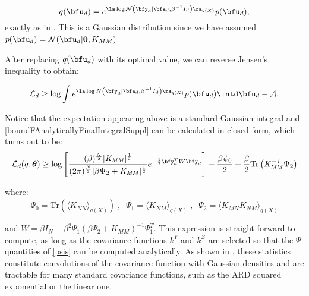 \begin{equation}
\label{qu}
q(\bfu_d) = e^{\la \log \mathcal{N} \left( \bfy_d | \bfa_d, \beta^{-1} I_d \right) \ra_{q(X)}}
		p(\bfu_d) ,
\end{equation}
exactly as in \cite{Titsias:bayesGPLVM10}. This is a Gaussian distribution since we have assumed
$p(\bfu_d ) = \mathcal{N} (\bfu_d | \mathbf{0}, K_{MM} )$.

\par After replacing $q(\bfu_d)$ with its optimal value, we can reverse Jensen's inequality to obtain:

\begin{equation}
\label{boundFAnalyticallyFinalIntegralSuppl}
\mathcal{L}_d \geq
	\log \int e^{\la \log N \left( \bfy_d | \bfa_d, \beta^{-1} I_d \right) \ra_{q(X)}}
		p(\bfu_d) \intd \bfu_d -\mathcal{A} .
\end{equation}

\noindent Notice that the expectation appearing above is a standard Gaussian integral and \eqref{boundFAnalyticallyFinalIntegralSuppl} can
be calculated in closed form, which turns out to be:
\begin{equation}
\label{LFinalSuppl}
\mathcal{L}_d(q, \boldsymbol \theta) \geq \log \left[ 
	\frac{(\beta)^{\frac{N}{2}} \vert \mathit{K_{MM}} \vert ^\frac{1}{2} }
		 {(2\pi)^{\frac{N}{2}} \vert \beta \Psi_2 + \mathit{K_{MM}}  \vert ^\frac{1}{2} } 
	 e^{-\frac{1}{2} \bfy^{T}_{d} W \bfy_d}
	 \right]	 -
	 \frac{\beta \psi_0}{2} + \frac{\beta}{2} 
	 \text{Tr} \left( \mathit{K_{MM}^{-1}} \Psi_2 \right)	
\end{equation}

\noindent where:
\begin{equation}
\label{psis}
\Psi_0 = \text{Tr}(\langle \mathit{K_{NN}} \rangle_{q(X)}) \;, \;\;
\Psi_1 = \langle \mathit{K_{NM}} \rangle_{q(X)} \;, \;\;
\Psi_2 = \langle \mathit{K_{MN}} \mathit{K_{NM}} \rangle_{q(X)}
\end{equation}

\noindent and $W = \beta I_N - \beta^2 \Psi_1 (\beta \Psi_2 + K_{MM})^{-1} \Psi_1^T$. This expression is straight forward to compute, as long as the covariance functions $k^Y$ and $k^Z$
 are selected so that the $\Psi$ quantities of \eqref{psis} can be computed analytically. As shown in \cite{Titsias:bayesGPLVM10}, these
statistics constitute convolutions of the covariance function with Gaussian densities and 
are tractable for many standard covariance functions, such as the ARD squared exponential or the linear one.


